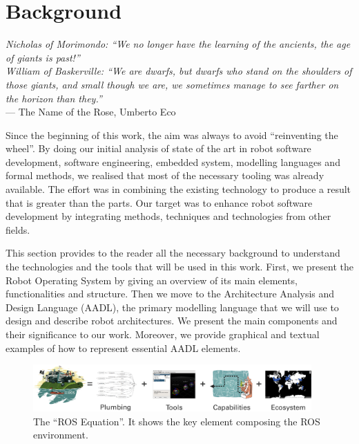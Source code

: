\chapter[Background]{Background}\label{ch:Background}

\begin{flushright}{\slshape Nicholas of Morimondo: ``We no longer have the learning of the ancients, the age of giants is past!'' \\
William of Baskerville: ``We are dwarfs, but dwarfs who stand on the shoulders of those giants, and small though we are, we sometimes manage to see farther on the horizon than they.''} \\ \medskip
    ---  The Name of the Rose, Umberto Eco
\end{flushright}

Since the beginning of this work, the aim was always to avoid ``reinventing the wheel''. By doing our initial analysis of state of the art in robot software development, software engineering, embedded system, modelling languages and formal methods, we realised that most of the necessary tooling was already available. The effort was in combining the existing technology to produce a result that is greater than the parts. Our target was to enhance robot software development by integrating methods, techniques and technologies from other fields.

This section provides to the reader all the necessary background to understand the technologies and the tools that will be used in this work. First, we present the Robot Operating System by giving an overview of its main elements, functionalities and structure. Then we move to the Architecture Analysis and Design Language (AADL), the primary modelling language that we will use to design and describe robot architectures. We present the main components and their significance to our work. Moreover, we provide graphical and textual examples of how to represent essential AADL elements. 

\newpage

\minitoc
\newpage

\begin{figure}[t]
    \centering
    \includegraphics[width=0.95\textwidth]{gfx/ros/ros_equation}
    \caption[The ``ROS Equation''.]{The ``ROS Equation''. It shows the key element composing the ROS environment. }\label{fig:ros}
\end{figure}


